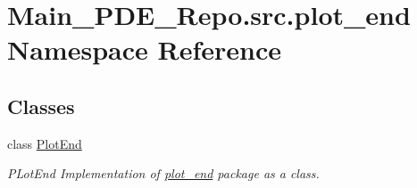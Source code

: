\hypertarget{namespaceMain__PDE__Repo_1_1src_1_1plot__end}{}\section{Main\+\_\+\+P\+D\+E\+\_\+\+Repo.\+src.\+plot\+\_\+end Namespace Reference}
\label{namespaceMain__PDE__Repo_1_1src_1_1plot__end}
\subsection*{Classes}
\begin{DoxyCompactItemize}
\item 
class \hyperlink{classMain__PDE__Repo_1_1src_1_1plot__end_1_1PlotEnd}{Plot\+End}
\begin{DoxyCompactList}\small\item\em P\+Lot\+End Implementation of \hyperlink{namespaceMain__PDE__Repo_1_1src_1_1plot__end}{plot\+\_\+end} package as a class. \end{DoxyCompactList}\end{DoxyCompactItemize}
